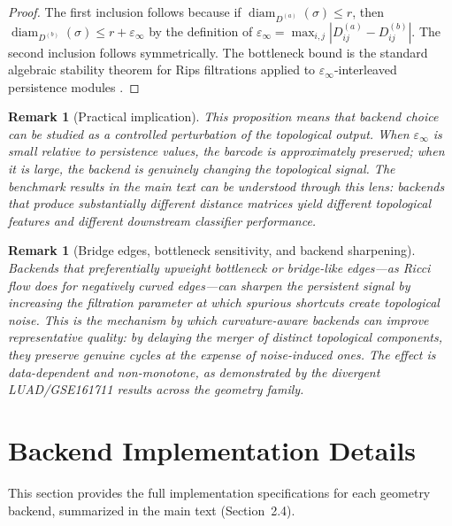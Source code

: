 \documentclass[11pt]{article}
\newtheorem{remark}[theorem]{Remark}
\DeclareMathOperator{\diam}{diam}
\begin{document}
\begin{proof}
The first inclusion follows because if $\diam_{D^{(a)}}(\sigma) \le r$, then $\diam_{D^{(b)}}(\sigma) \le r + \varepsilon_\infty$ by the definition of $\varepsilon_\infty = \max_{i,j} |D^{(a)}_{ij} - D^{(b)}_{ij}|$.
The second inclusion follows symmetrically.
The bottleneck bound is the standard algebraic stability theorem for Rips filtrations applied to $\varepsilon_\infty$-interleaved persistence modules \cite{chazal2014persistence}.
\end{proof}

\begin{remark}[Practical implication]\label{rem:supp_perturbation}
This proposition means that backend choice can be studied as a \emph{controlled perturbation} of the topological output.
When $\varepsilon_\infty$ is small relative to persistence values, the barcode is approximately preserved; when it is large, the backend is genuinely changing the topological signal.
The benchmark results in the main text can be understood through this lens: backends that produce substantially different distance matrices yield different topological features and different downstream classifier performance.
\end{remark}

\begin{remark}[Bridge edges, bottleneck sensitivity, and backend sharpening]\label{rem:supp_bridge}
Backends that preferentially upweight bottleneck or bridge-like edges---as Ricci flow does for negatively curved edges---can sharpen the persistent signal by increasing the filtration parameter at which spurious shortcuts create topological noise.
This is the mechanism by which curvature-aware backends can improve representative quality: by delaying the merger of distinct topological components, they preserve genuine cycles at the expense of noise-induced ones.
The effect is data-dependent and non-monotone, as demonstrated by the divergent LUAD/GSE161711 results across the geometry family.
\end{remark}


\section{Backend Implementation Details}
\label{sec:supp_backends}

This section provides the full implementation specifications for each geometry backend, summarized in the main text (Section~2.4).
\end{document}
